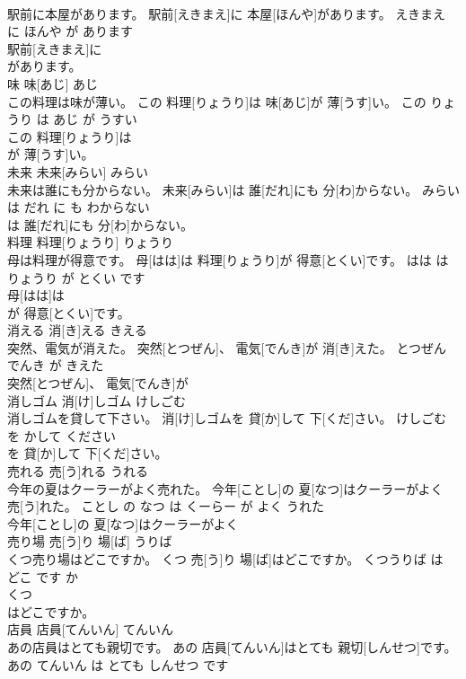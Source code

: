 \documentclass[8pt]{extreport}
\begin{document}
\begin{CJK}{UTF8}{min}
\\	駅前に本屋があります。	駅前[えきまえ]に 本屋[ほんや]があります。	えきまえ に ほんや が あります	
\\	駅前[えきまえ]に
\\	があります。			
\\	味	味[あじ]	あじ	
\\	この料理は味が薄い。	この 料理[りょうり]は 味[あじ]が 薄[うす]い。	この りょうり は あじ が うすい	
\\	この 料理[りょうり]は
\\	が 薄[うす]い。			
\\	未来	未来[みらい]	みらい	
\\	未来は誰にも分からない。	未来[みらい]は 誰[だれ]にも 分[わ]からない。	みらい は だれ に も わからない	
\\	は 誰[だれ]にも 分[わ]からない。			
\\	料理	料理[りょうり]	りょうり	
\\	母は料理が得意です。	母[はは]は 料理[りょうり]が 得意[とくい]です。	はは は りょうり が とくい です	
\\	母[はは]は
\\	が 得意[とくい]です。			
\\	消える	消[き]える	きえる	
\\	突然、電気が消えた。	突然[とつぜん]、 電気[でんき]が 消[き]えた。	とつぜん でんき が きえた	
\\	突然[とつぜん]、 電気[でんき]が
\\	消しゴム	消[け]しゴム	けしごむ	
\\	消しゴムを貸して下さい。	消[け]しゴムを 貸[か]して 下[くだ]さい。	けしごむ を かして ください	
\\	を 貸[か]して 下[くだ]さい。			
\\	売れる	売[う]れる	うれる	
\\	今年の夏はクーラーがよく売れた。	今年[ことし]の 夏[なつ]はクーラーがよく 売[う]れた。	ことし の なつ は くーらー が よく うれた	
\\	今年[ことし]の 夏[なつ]はクーラーがよく
\\	売り場	売[う]り 場[ば]	うりば	
\\	くつ売り場はどこですか。	くつ 売[う]り 場[ば]はどこですか。	くつうりば は どこ です か	
\\	くつ
\\	はどこですか。			
\\	店員	店員[てんいん]	てんいん	
\\	あの店員はとても親切です。	あの 店員[てんいん]はとても 親切[しんせつ]です。	あの てんいん は とても しんせつ です	

\end{CJK}
\end{document}
